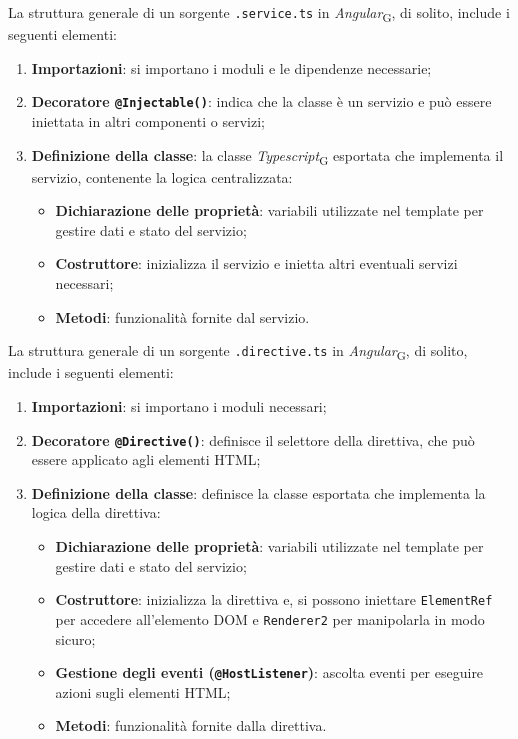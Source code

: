 La struttura generale di un sorgente \texttt{.service.ts} in \textit{Angular}\textsubscript{G}, di solito, include i seguenti elementi:
\begin{enumerate}
    \item \textbf{Importazioni}: si importano i moduli e le dipendenze necessarie;
    \item \textbf{Decoratore \texttt{@Injectable()}}: indica che la classe è un servizio e può essere iniettata in altri componenti o servizi;
    \item \textbf{Definizione della classe}: la classe \textit{Typescript}\textsubscript{G} esportata che implementa il servizio, contenente la logica centralizzata:
    \begin{itemize}
        \item \textbf{Dichiarazione delle proprietà}: variabili utilizzate nel template per gestire dati e stato del servizio;
        \item \textbf{Costruttore}: inizializza il servizio e inietta altri eventuali servizi necessari;
        \item \textbf{Metodi}: funzionalità fornite dal servizio.
    \end{itemize}
\end{enumerate}

La struttura generale di un sorgente \texttt{.directive.ts} in \textit{Angular}\textsubscript{G}, di solito, include i seguenti elementi:
\begin{enumerate}
    \item \textbf{Importazioni}: si importano i moduli necessari;
    \item \textbf{Decoratore \texttt{@Directive()}}: definisce il selettore della direttiva, che può essere applicato agli elementi HTML;
    \item \textbf{Definizione della classe}: definisce la classe esportata che implementa la logica della direttiva:
    \begin{itemize}
        \item \textbf{Dichiarazione delle proprietà}: variabili utilizzate nel template per gestire dati e stato del servizio;
        \item \textbf{Costruttore}: inizializza la direttiva e, si possono iniettare \texttt{ElementRef} per accedere all'elemento DOM e \texttt{Renderer2} per manipolarla in modo sicuro;
        \item \textbf{Gestione degli eventi (\texttt{@HostListener})}: ascolta eventi per eseguire azioni sugli elementi HTML;
        \item \textbf{Metodi}: funzionalità fornite dalla direttiva.
    \end{itemize}
\end{enumerate}

